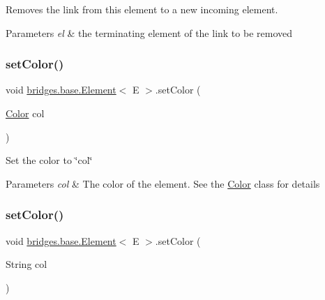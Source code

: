 Removes the link from this element to a new incoming element. 


\begin{DoxyParams}{Parameters}
{\em el} & the terminating element of the link to be removed \\
\hline
\end{DoxyParams}
\mbox{\label{classbridges_1_1base_1_1_element_aeb3336746d41a180e50b5efaff2dedc2}} 
\subsubsection{\texorpdfstring{setColor()}{setColor()}\hspace{0.1cm}{\footnotesize\ttfamily [1/2]}}
{\footnotesize\ttfamily void \mbox{\hyperlink{classbridges_1_1base_1_1_element}{bridges.\+base.\+Element}}$<$ E $>$.set\+Color (\begin{DoxyParamCaption}\item[{\mbox{\hyperlink{classbridges_1_1base_1_1_color}{Color}}}]{col }\end{DoxyParamCaption})}

Set the color to \char`\"{}col\char`\"{} 
\begin{DoxyParams}{Parameters}
{\em col} & The color of the element. See the \mbox{\hyperlink{classbridges_1_1base_1_1_color}{Color}} class for details \\
\hline
\end{DoxyParams}
\mbox{\label{classbridges_1_1base_1_1_element_a336f2ff70a0873fde6f0b8a43b670ffc}} 
\subsubsection{\texorpdfstring{setColor()}{setColor()}\hspace{0.1cm}{\footnotesize\ttfamily [2/2]}}
{\footnotesize\ttfamily void \mbox{\hyperlink{classbridges_1_1base_1_1_element}{bridges.\+base.\+Element}}$<$ E $>$.set\+Color (\begin{DoxyParamCaption}\item[{String}]{col }\end{DoxyParamCaption})}



